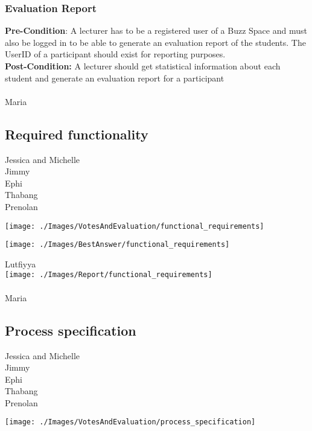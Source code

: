 \documentclass[a4paper,11pt]{article}
\begin{document}
\subsubsection{Evaluation Report}
\textbf{Pre-Condition}: A lecturer has to be a registered user of a Buzz Space and must also be logged in to be able to generate an evaluation report of the students. The UserID of a participant should exist for reporting purposes.
\\
\textbf{Post-Condition:} A lecturer should get statistical information about each student and generate an evaluation report for a participant
\\
\\

Maria\\

\subsection{Required functionality}
Jessica and Michelle\\
Jimmy\\
Ephi\\
Thabang\\
Prenolan\\
\begin{center}
\texttt{[image: ./Images/VotesAndEvaluation/functional\_requirements]}
\end{center}

\begin{center}
\texttt{[image: ./Images/BestAnswer/functional\_requirements]}
\end{center}

Lutfiyya\\
\texttt{[image: ./Images/Report/functional\_requirements]}\\
\\

Maria\\

\subsection{Process specification}
Jessica and Michelle\\
Jimmy\\
Ephi\\
Thabang\\
Prenolan\\
\begin{center}
\texttt{[image: ./Images/VotesAndEvaluation/process\_specification]}
\end{center}
\end{document}
